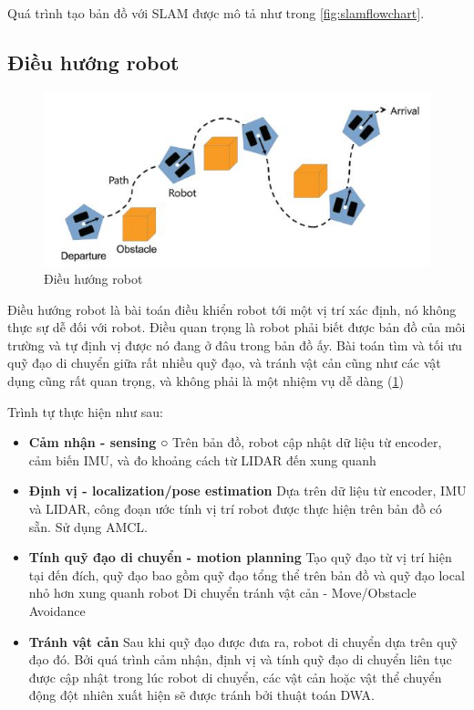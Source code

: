 Quá trình tạo bản đồ với SLAM được mô tả như trong \figurename{\ref{fig:slamflowchart}}.

\subsection{Điều hướng robot}
\begin{figure}[tph]
	\centering
	\includegraphics[width=0.7\linewidth]{chapter2/figs/navigation}
	\caption{Điều hướng robot}
	\label{fig:navigation}
\end{figure}
Điều hướng robot là bài toán điều khiển robot tới một vị trí xác định, nó không thực sự dễ đối với robot. Điều quan trọng là robot phải biết được bản đồ của môi trường và tự định vị được nó đang ở đâu trong bản đồ ấy. Bài toán tìm và tối ưu quỹ đạo di chuyển giữa rất nhiều quỹ đạo, và tránh vật cản cũng như các vật dụng cũng rất quan trọng, và không phải là một nhiệm vụ dễ dàng (\figurename{\ref{fig:navigation}})

Trình tự thực hiện như sau:
\begin{itemize}
	\item \textbf{Cảm nhận - sensing}
	○ Trên bản đồ, robot cập nhật dữ liệu từ encoder, cảm biến IMU, và đo khoảng cách từ LIDAR đến xung quanh
	\item \textbf{Định vị - localization/pose estimation}
	Dựa trên dữ liệu từ encoder, IMU và LIDAR, công đoạn ước tính vị trí robot được thực hiện trên bản đồ có sẵn. Sử dụng AMCL.
	\item \textbf{Tính quỹ đạo di chuyển - motion planning}
	Tạo quỹ đạo từ vị trí hiện tại đến đích, quỹ đạo bao gồm quỹ đạo tổng thể trên bản đồ và quỹ đạo local nhỏ hơn xung quanh robot
	Di chuyển tránh vật cản - Move/Obstacle Avoidance
	\item \textbf{Tránh vật cản}
	Sau khi quỹ đạo được đưa ra, robot di chuyển dựa trên quỹ đạo đó. Bởi quá trình cảm nhận, định vị và tính quỹ đạo di chuyển liên tục được cập nhật trong lúc robot di chuyển, các vật cản hoặc vật thể chuyển động đột nhiên xuất hiện sẽ được tránh bởi thuật toán DWA.
		
\end{itemize}

